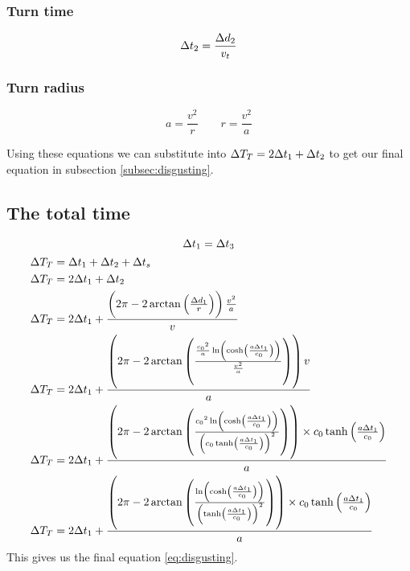\begin{samepagecols}{2}
			\subsubsection{Turn time}
				\begin{equation*}
					\mathrm{\Delta} t_2 = \frac{\mathrm{\Delta} d_2}{v_t}
				\end{equation*}
			\subsubsection{Turn radius}
				\begin{equation*}
					a = \frac{v^2}{r} \qquad r = \frac{v^2}{a}
				\end{equation*}
		\end{samepagecols}
		Using these equations we can substitute into $\mathrm{\Delta} T_T = 2\mathrm{\Delta} t_1 + \mathrm{\Delta} t_2$ to get our final equation in subsection \vref{subsec:disgusting}.
	\subsection{The total time}\label{subsec:disgusting}
		\[\mathrm{\Delta} t_1 = \mathrm{\Delta} t_3\]
		\begin{align}
			\Del T_T &= \Del t_1 + \Del t_2 + \Del t_s\nonumber\\
			\Del T_T &= 2\Del t_1 + \Del t_2\nonumber\\
			\Del T_T &= 2\Del t_1 + \frac{\left(2\pi - 2\arctan\left(\frac{\Del d_1}{r}\right)\right) \frac{v^2}{a}}{v}\nonumber\\
			\Del T_T &= 2\Del t_1+\frac{\left(2\pi - 2\arctan\left(\frac{\frac{\si{\clight}^2}{a}\ln\left(\cosh\left(\frac{a\Del t_1}{\si{\clight}}\right)\right)}{\frac{v^2}{a}}\right)\right) v}{a}\nonumber\\
			\Del T_T &= 2\Del t_1+\frac{\left(2\pi-2\arctan\left(\frac{\si{\clight}^2\ln\left(\cosh\left(\frac{a\Del t_1}{\si{\clight}}\right)\right)}{\left(\si{\clight}\tanh\left(\frac{a\Del t_1}{\si{\clight}}\right)\right)^2}\right)\right) \times \si{\clight}\tanh\left(\frac{a\Del t_1}{\si{\clight}}\right)}{a}\nonumber\\
			\Del T_T &= 2\Del t_1+\frac{\left(2\pi-2\arctan\left(\frac{\ln\left(\cosh\left(\frac{a\Del t_1}{\si{\clight}}\right)\right)}{\left(\tanh\left(\frac{a\Del t_1}{\si{\clight}}\right)\right)^2}\right)\right) \times \si{\clight}\tanh\left(\frac{a\Del t_1}{\si{\clight}}\right)}{a}\label{eq:disgusting}
		\end{align}
		This gives us the final equation \eqref{eq:disgusting}.

